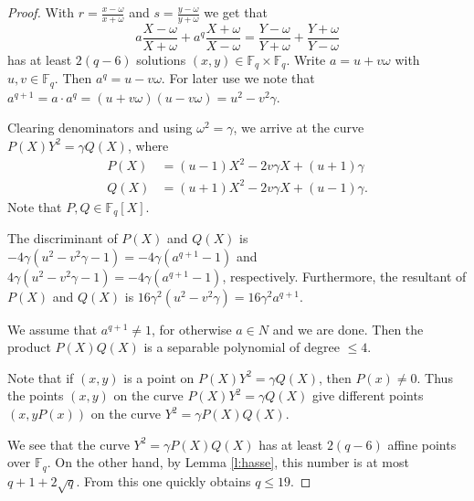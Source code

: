 \documentclass[10pt,a4paper]{amsart}
\newcommand{\FF}{\mathbb F}
\begin{document}
\begin{proof}
  With $r=\frac{x-\omega}{x+\omega}$ and $s=\frac{y-\omega}{y+\omega}$
  we get that
  \[
    a\frac{X-\omega}{X+\omega} + a^q\frac{X+\omega}{X-\omega} =
    \frac{Y-\omega}{Y+\omega} + \frac{Y+\omega}{Y-\omega}
  \]
  has at least $2(q-6)$ solutions $(x,y)\in\FF_q\times\FF_q$. Write
  $a=u+v\omega$ with $u,v\in\FF_q$. Then $a^q=u-v\omega$. For later
  use we note that
  $a^{q+1}=a\cdot a^q=(u+v\omega)(u-v\omega)=u^2-v^2\gamma$.

  Clearing denominators and using $\omega^2=\gamma$, we arrive at the
  curve $P(X)Y^2 = \gamma Q(X)$, where
  \begin{align*}
    P(X) &= \left(u - 1\right) X^{2} - 2 v \gamma X + (u+1)\gamma\\
    Q(X) &= \left(u + 1\right) X^{2} - 2 v \gamma X + (u-1)\gamma.
  \end{align*}
  Note that $P, Q\in\FF_q[X]$.

  The discriminant of $P(X)$ and $Q(X)$ is
  $-4\gamma(u^2-v^2\gamma - 1)=-4\gamma(a^{q+1}-1)$ and
  $4\gamma(u^2-v^2\gamma - 1)=-4\gamma(a^{q+1}-1)$,
  respectively. Furthermore, the resultant of $P(X)$ and $Q(X)$ is
  $16\gamma^2(u^2-v^2\gamma)=16\gamma^2a^{q+1}$.

  We assume that $a^{q+1}\ne1$, for otherwise $a\in N$ and we are
  done. Then the product $P(X)Q(X)$ is a separable polynomial of
  degree $\le4$.

  Note that if $(x,y)$ is a point on $P(X)Y^2 = \gamma Q(X)$, then
  $P(x)\ne0$. Thus the points $(x,y)$ on the curve
  $P(X)Y^2 = \gamma Q(X)$ give different points $(x, yP(x))$ on the
  curve $Y^2=\gamma P(X)Q(X)$.

  We see that the curve $Y^2=\gamma P(X)Q(X)$ has at least $2(q-6)$
  affine points over $\FF_q$. On the other hand, by Lemma
  \ref{l:hasse}, this number is at most $q+1+2\sqrt{q}$. From this one
  quickly obtains $q\le19$.
\end{proof}
\end{document}

